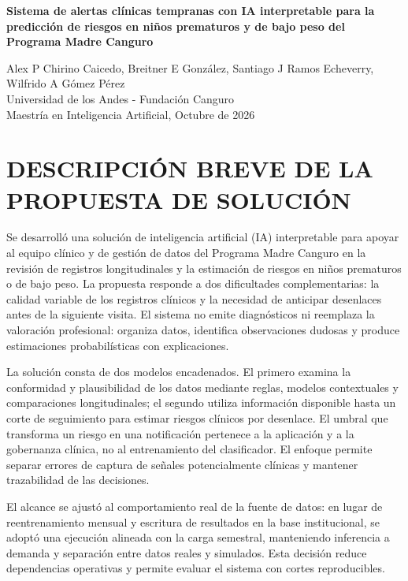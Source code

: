 \documentclass[letterpaper,10pt]{article}
\begin{document}
\begin{center}
{\Large\bfseries Sistema de alertas clínicas tempranas con IA interpretable para la predicción de riesgos en niños prematuros y de bajo peso del Programa Madre Canguro\par}
\vspace{10pt}
Alex P Chirino Caicedo, Breitner E González, Santiago J Ramos Echeverry, Wilfrido A Gómez Pérez\\
Universidad de los Andes - Fundación Canguro\\
Maestría en Inteligencia Artificial, Octubre de 2026
\end{center}

\section{DESCRIPCIÓN BREVE DE LA PROPUESTA DE SOLUCIÓN}

Se desarrolló una solución de inteligencia artificial (IA) interpretable para apoyar al equipo clínico y de gestión de datos del Programa Madre Canguro \cite{charpak2005,who2022} en la revisión de registros longitudinales y la estimación de riesgos en niños prematuros o de bajo peso. La propuesta responde a dos dificultades complementarias: la calidad variable de los registros clínicos y la necesidad de anticipar desenlaces antes de la siguiente visita. El sistema no emite diagnósticos ni reemplaza la valoración profesional: organiza datos, identifica observaciones dudosas y produce estimaciones probabilísticas con explicaciones.

La solución consta de dos modelos encadenados. El primero examina la conformidad y plausibilidad de los datos mediante reglas, modelos contextuales y comparaciones longitudinales; el segundo utiliza información disponible hasta un corte de seguimiento para estimar riesgos clínicos por desenlace. El umbral que transforma un riesgo en una notificación pertenece a la aplicación y a la gobernanza clínica, no al entrenamiento del clasificador. El enfoque permite separar errores de captura de señales potencialmente clínicas y mantener trazabilidad de las decisiones.

El alcance se ajustó al comportamiento real de la fuente de datos: en lugar de reentrenamiento mensual y escritura de resultados en la base institucional, se adoptó una ejecución alineada con la carga semestral, manteniendo inferencia a demanda y separación entre datos reales y simulados. Esta decisión reduce dependencias operativas y permite evaluar el sistema con cortes reproducibles.
\end{document}
